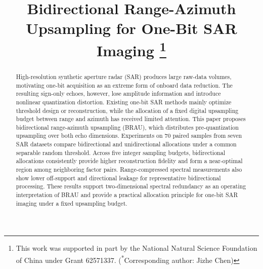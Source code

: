 \documentclass[conference]{IEEEtran}
\begin{document}
\title{Bidirectional Range-Azimuth Upsampling for One-Bit SAR Imaging
\thanks{This work was supported in part by the National Natural Science Foundation of China under Grant 62571337. (\textsuperscript{*}Corresponding author: Jizhe Chen)}
}

\author{
\and
{}
\and
{}
}

\maketitle

\begin{abstract}
High-resolution synthetic aperture radar (SAR) produces large raw-data volumes, motivating one-bit acquisition as an extreme form of onboard data reduction. The resulting sign-only echoes, however, lose amplitude information and introduce nonlinear quantization distortion. Existing one-bit SAR methods mainly optimize threshold design or reconstruction, while the allocation of a fixed digital upsampling budget between range and azimuth has received limited attention. This paper proposes bidirectional range-azimuth upsampling (BRAU), which distributes pre-quantization upsampling over both echo dimensions. Experiments on 70 paired samples from seven SAR datasets compare bidirectional and unidirectional allocations under a common separable random threshold. Across five integer sampling budgets, bidirectional allocations consistently provide higher reconstruction fidelity and form a near-optimal region among neighboring factor pairs. Range-compressed spectral measurements also show lower off-support and directional leakage for representative bidirectional processing. These results support two-dimensional spectral redundancy as an operating interpretation of BRAU and provide a practical allocation principle for one-bit SAR imaging under a fixed upsampling budget.
\end{abstract}
\end{document}
